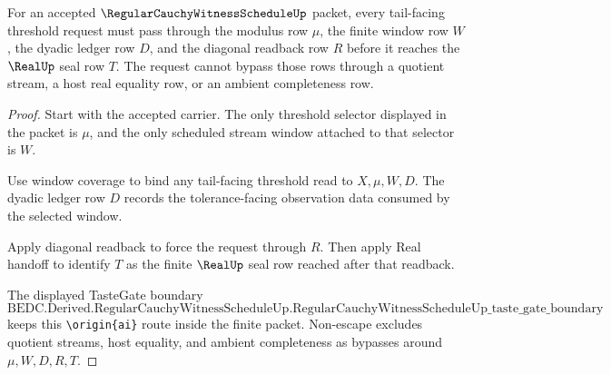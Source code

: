 \begin{theorem}
\label{thm:regular-cauchy-witness-schedule-tail-threshold-readback}
For an accepted $\RegularCauchyWitnessScheduleUp$ packet, every tail-facing threshold request must pass through the modulus row $\mu$, the finite window row $W$, the dyadic ledger row $D$, and the diagonal readback row $R$ before it reaches the $\RealUp$ seal row $T$. The request cannot bypass those rows through a quotient stream, a host real equality row, or an ambient completeness row.
\end{theorem}
\begin{proof}
Start with the accepted carrier. The only threshold selector displayed in the packet is $\mu$, and the only scheduled stream window attached to that selector is $W$.

Use window coverage to bind any tail-facing threshold read to $X,\mu,W,D$. The dyadic ledger row $D$ records the tolerance-facing observation data consumed by the selected window.

Apply diagonal readback to force the request through $R$. Then apply Real handoff to identify $T$ as the finite $\RealUp$ seal row reached after that readback.

The displayed TasteGate boundary
$$
\text{BEDC.Derived.RegularCauchyWitnessScheduleUp.RegularCauchyWitnessScheduleUp\_taste\_gate\_boundary}
$$
keeps this \texttt{\textbackslash origin\{ai\}} route inside the finite packet. Non-escape excludes quotient streams, host equality, and ambient completeness as bypasses around $\mu,W,D,R,T$.
\end{proof}

